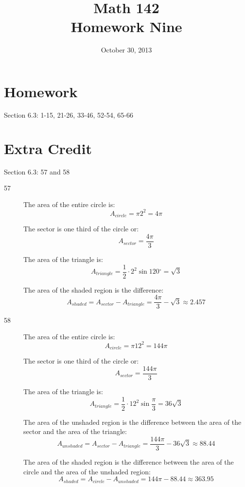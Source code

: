 \documentclass{exam}
\author{}
\date{October 30, 2013}
\title{Math 142 \\ Homework Nine}
\newcommand{\dg}{\ensuremath{^\circ}}
\begin{document}
  \maketitle

  \section{Homework}
  Section 6.3: 1-15, 21-26, 33-46, 52-54, 65-66

  \section{Extra Credit}
  Section 6.3: 57 and 58

  \ifprintanswers
    \begin{description}
      \item[57]
        The area of the entire circle is: 
        \[
          A_{circle} = \pi 2^2 = 4 \pi
        \]

        The sector is one third of the circle or: 
        \[
          A_{sector} = \frac{4 \pi}{3}
        \]

        The area of the triangle is: 
        \[
          A_{triangle} = \frac{1}{2} \cdot 2^2 \sin 120 \dg = \sqrt{3}
        \]

        The area of the shaded region is the difference:
        \[
          A_{shaded} = A_{sector} - A_{triangle} = \frac{4 \pi}{3} - \sqrt{3} \approx \boxed{ 2.457 }
        \]

      \item[58]
        The area of the entire circle is: 
        \[
          A_{circle} = \pi 12^2 = 144 \pi
        \]

        The sector is one third of the circle or: 
        \[
          A_{sector} = \frac{144 \pi}{3}
        \]

        The area of the triangle is: 
        \[
          A_{triangle} = \frac{1}{2} \cdot 12^2 \sin \frac{\pi}{3} = 36 \sqrt{3}
        \]

        The area of the unshaded region is the difference between the area of the sector and the area of the triangle:
        \[
          A_{unshaded} = A_{sector} - A_{triangle} = \frac{144 \pi}{3} - 36 \sqrt{3} \approx 88.44
        \]

        The area of the shaded region is the difference between the area of the circle and the area of the unshaded
        region:
        \[
          A_{shaded} = A_{circle} - A_{unshaded} = 144 \pi - 88.44 \approx \boxed{ 363.95 }
        \]
      \end{description}
\end{document}
